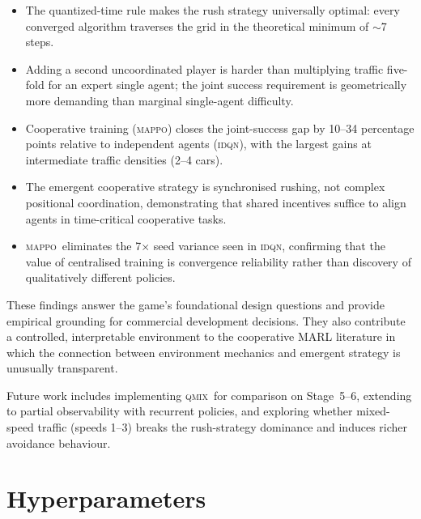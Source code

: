 \documentclass[12pt]{article}
\newcommand{\MAPPO}{\textsc{mappo}}
\newcommand{\QMIX}{\textsc{qmix}}
\newcommand{\IDQN}{\textsc{idqn}}
\begin{document}
\begin{itemize}
  \item The quantized-time rule makes the rush strategy universally optimal:
        every converged algorithm traverses the grid in the theoretical minimum
        of $\sim$7 steps.
  \item Adding a second uncoordinated player is harder than multiplying traffic
        five-fold for an expert single agent; the joint success requirement is
        geometrically more demanding than marginal single-agent difficulty.
  \item Cooperative training (\MAPPO) closes the joint-success gap by
        10--34 percentage points relative to independent agents (\IDQN), with
        the largest gains at intermediate traffic densities (2--4 cars).
  \item The emergent cooperative strategy is synchronised rushing, not complex
        positional coordination, demonstrating that shared incentives suffice
        to align agents in time-critical cooperative tasks.
  \item \MAPPO\ eliminates the 7$\times$ seed variance seen in \IDQN, confirming
        that the value of centralised training is convergence reliability rather
        than discovery of qualitatively different policies.
\end{itemize}

These findings answer the game's foundational design questions and provide
empirical grounding for commercial development decisions.  They also
contribute a controlled, interpretable environment to the cooperative MARL
literature in which the connection between environment mechanics and emergent
strategy is unusually transparent.

Future work includes implementing \QMIX\ for comparison on Stage~5--6,
extending to partial observability with recurrent policies, and exploring
whether mixed-speed traffic (speeds 1--3) breaks the rush-strategy dominance
and induces richer avoidance behaviour.




\appendix
\section{Hyperparameters}
\label{app:hparams}
\end{document}
